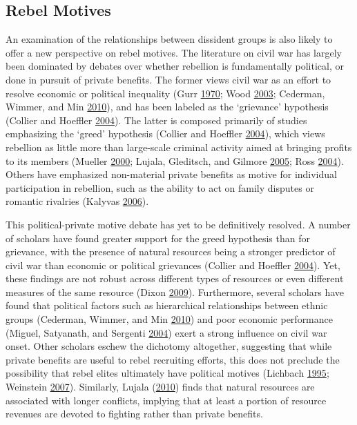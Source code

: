 \documentclass[12pt,]{book}
\theoremstyle{definition}
\theoremstyle{definition}
\theoremstyle{definition}
\theoremstyle{remark}
\begin{document}
\hypertarget{rebel-motives}{%
\subsection{Rebel Motives}\label{rebel-motives}}

An examination of the relationships between dissident groups is also
likely to offer a new perspective on rebel motives. The literature on
civil war has largely been dominated by debates over whether rebellion
is fundamentally political, or done in pursuit of private benefits. The
former views civil war as an effort to resolve economic or political
inequality (Gurr \protect\hyperlink{ref-gurr70}{1970}; Wood
\protect\hyperlink{ref-Wood2003}{2003}; Cederman, Wimmer, and Min
\protect\hyperlink{ref-Cederman2010}{2010}), and has been labeled as the
`grievance' hypothesis (Collier and Hoeffler
\protect\hyperlink{ref-Collier2004}{2004}). The latter is composed
primarily of studies emphasizing the `greed' hypothesis (Collier and
Hoeffler \protect\hyperlink{ref-Collier2004}{2004}), which views
rebellion as little more than large-scale criminal activity aimed at
bringing profits to its members (Mueller
\protect\hyperlink{ref-mueller00}{2000}; Lujala, Gleditsch, and Gilmore
\protect\hyperlink{ref-Lujala2005}{2005}; Ross
\protect\hyperlink{ref-Ross2004e}{2004}). Others have emphasized
non-material private benefits as motive for individual participation in
rebellion, such as the ability to act on family disputes or romantic
rivalries (Kalyvas \protect\hyperlink{ref-Kalyvas2006}{2006}).

This political-private motive debate has yet to be definitively
resolved. A number of scholars have found greater support for the greed
hypothesis than for grievance, with the presence of natural resources
being a stronger predictor of civil war than economic or political
grievances (Collier and Hoeffler
\protect\hyperlink{ref-Collier2004}{2004}). Yet, these findings are not
robust across different types of resources or even different measures of
the same resource (Dixon \protect\hyperlink{ref-Dixon2009a}{2009}).
Furthermore, several scholars have found that political factors such as
hierarchical relationships between ethnic groups (Cederman, Wimmer, and
Min \protect\hyperlink{ref-Cederman2010}{2010}) and poor economic
performance (Miguel, Satyanath, and Sergenti
\protect\hyperlink{ref-Miguel2004a}{2004}) exert a strong influence on
civil war onset. Other scholars eschew the dichotomy altogether,
suggesting that while private benefits are useful to rebel recruiting
efforts, this does not preclude the possibility that rebel elites
ultimately have political motives (Lichbach
\protect\hyperlink{ref-Lichbach1995}{1995}; Weinstein
\protect\hyperlink{ref-Weinstein2007}{2007}). Similarly, Lujala
(\protect\hyperlink{ref-Lujala2010}{2010}) finds that natural resources
are associated with longer conflicts, implying that at least a portion
of resource revenues are devoted to fighting rather than private
benefits.
\end{document}
